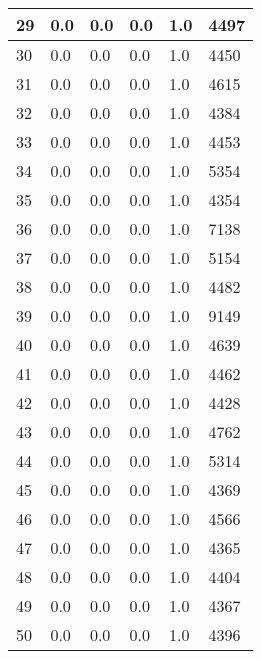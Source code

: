 \begin{longtable}{|l|l|l|l|l|l|}
29 & 0.0 & 0.0 & 0.0 & 1.0 & 4497 \\ \hline 
30 & 0.0 & 0.0 & 0.0 & 1.0 & 4450 \\ \hline 
31 & 0.0 & 0.0 & 0.0 & 1.0 & 4615 \\ \hline 
32 & 0.0 & 0.0 & 0.0 & 1.0 & 4384 \\ \hline 
33 & 0.0 & 0.0 & 0.0 & 1.0 & 4453 \\ \hline 
34 & 0.0 & 0.0 & 0.0 & 1.0 & 5354 \\ \hline 
35 & 0.0 & 0.0 & 0.0 & 1.0 & 4354 \\ \hline 
36 & 0.0 & 0.0 & 0.0 & 1.0 & 7138 \\ \hline 
37 & 0.0 & 0.0 & 0.0 & 1.0 & 5154 \\ \hline 
38 & 0.0 & 0.0 & 0.0 & 1.0 & 4482 \\ \hline 
39 & 0.0 & 0.0 & 0.0 & 1.0 & 9149 \\ \hline 
40 & 0.0 & 0.0 & 0.0 & 1.0 & 4639 \\ \hline 
41 & 0.0 & 0.0 & 0.0 & 1.0 & 4462 \\ \hline 
42 & 0.0 & 0.0 & 0.0 & 1.0 & 4428 \\ \hline 
43 & 0.0 & 0.0 & 0.0 & 1.0 & 4762 \\ \hline 
44 & 0.0 & 0.0 & 0.0 & 1.0 & 5314 \\ \hline 
45 & 0.0 & 0.0 & 0.0 & 1.0 & 4369 \\ \hline 
46 & 0.0 & 0.0 & 0.0 & 1.0 & 4566 \\ \hline 
47 & 0.0 & 0.0 & 0.0 & 1.0 & 4365 \\ \hline 
48 & 0.0 & 0.0 & 0.0 & 1.0 & 4404 \\ \hline 
49 & 0.0 & 0.0 & 0.0 & 1.0 & 4367 \\ \hline 
50 & 0.0 & 0.0 & 0.0 & 1.0 & 4396 \\ \hline 
\end{longtable}
